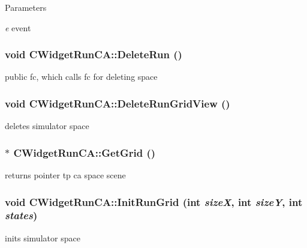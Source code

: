 \begin{DoxyParams}{Parameters}
\item[{\em e}]event \end{DoxyParams}
\hypertarget{classCWidgetRunCA_a4ad65849d43d161a9d9669c68e7a8a09}{
\subsubsection[{DeleteRun}]{\setlength{\rightskip}{0pt plus 5cm}void CWidgetRunCA::DeleteRun ()}}
\label{classCWidgetRunCA_a4ad65849d43d161a9d9669c68e7a8a09}
public fc, which calls fc for deleting space \hypertarget{classCWidgetRunCA_a60ba9306ab165cd11701226975f077da}{
\subsubsection[{DeleteRunGridView}]{\setlength{\rightskip}{0pt plus 5cm}void CWidgetRunCA::DeleteRunGridView ()}}
\label{classCWidgetRunCA_a60ba9306ab165cd11701226975f077da}
deletes simulator space \hypertarget{classCWidgetRunCA_a3d5e7c81fb6ca9a403a7e09b095406f8}{
\subsubsection[{GetGrid}]{ $\ast$ CWidgetRunCA::GetGrid ()}}
\label{classCWidgetRunCA_a3d5e7c81fb6ca9a403a7e09b095406f8}
returns pointer tp ca space scene \hypertarget{classCWidgetRunCA_a03a2ff0e531cc8308fdb26e0e2adca3f}{
\subsubsection[{InitRunGrid}]{\setlength{\rightskip}{0pt plus 5cm}void CWidgetRunCA::InitRunGrid (int {\em sizeX}, \/  int {\em sizeY}, \/  int {\em states})}}
\label{classCWidgetRunCA_a03a2ff0e531cc8308fdb26e0e2adca3f}
inits simulator space


